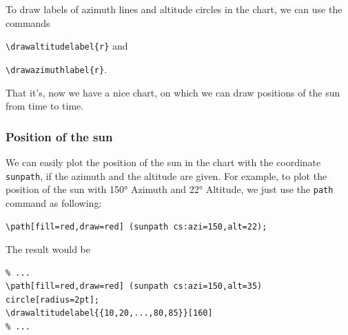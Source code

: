 

To draw labels of azimuth lines and altitude circles in the chart, we can use the commands 

\verb:\drawaltitudelabel{r}: and

\verb:\drawazimuthlabel{r}:.


That it's, now we have a nice chart, on which we can draw positions of the sun from time to time.

\subsubsection{Position of the sun}

We can easily plot the position of the sun in the chart with the coordinate \texttt{sunpath}, 
if the azimuth and the altitude are given.
For example, to plot the position of the sun with 150° Azimuth and 22° Altitude, 
we just use the \texttt{path} command as following:

\verb|\path[fill=red,draw=red] (sunpath cs:azi=150,alt=22);|

The result would be

\begin{verbatim}
% ...
\path[fill=red,draw=red] (sunpath cs:azi=150,alt=35) circle[radius=2pt];
\drawaltitudelabel{{10,20,...,80,85}}[160]
% ...
\end{verbatim}


